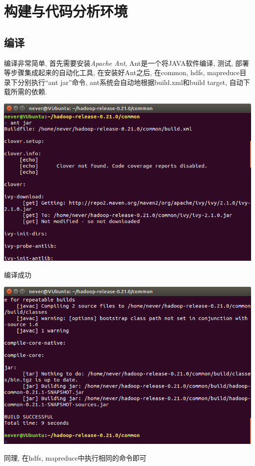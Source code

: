 %
\chapter{构建与代码分析环境}
\label{ch:env}
\section{编译}

编译{\Hadoop}非常简单, 首先需要安装\emph{Apache Ant}, Ant是一个将JAVA软件编译, 测试,
部署等步骤集成起来的自动化工具, 在安装好Ant之后,
在common, hdfs, mapreduce目录下分别执行``ant jar''命令,
ant系统会自动地根据build.xml和build target, 自动下载所需的依赖.

\includegraphics[width=\textwidth]{image/env/cr0.png}

编译成功

\includegraphics[width=\textwidth]{image/env/cr0.1.png}

同理, 在hdfs, mapreduce中执行相同的命令即可


